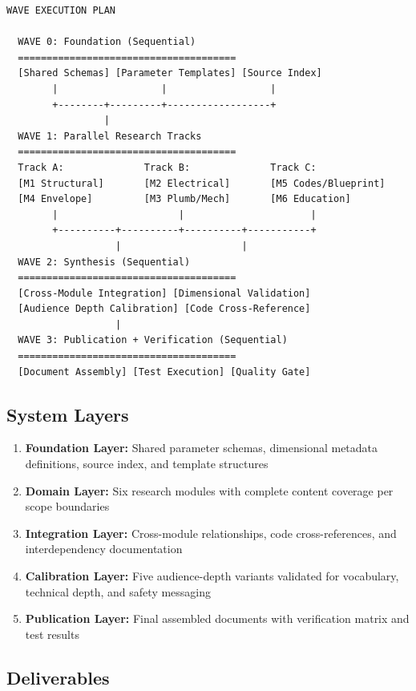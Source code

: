 \documentclass[11pt,letterpaper]{article}
\begin{document}
\begin{asciibox}
\begin{verbatim}
WAVE EXECUTION PLAN

  WAVE 0: Foundation (Sequential)
  ======================================
  [Shared Schemas] [Parameter Templates] [Source Index]
        |                  |                  |
        +--------+---------+------------------+
                 |
  WAVE 1: Parallel Research Tracks
  ======================================
  Track A:              Track B:              Track C:
  [M1 Structural]       [M2 Electrical]       [M5 Codes/Blueprint]
  [M4 Envelope]         [M3 Plumb/Mech]       [M6 Education]
        |                     |                      |
        +----------+----------+----------+-----------+
                   |                     |
  WAVE 2: Synthesis (Sequential)
  ======================================
  [Cross-Module Integration] [Dimensional Validation]
  [Audience Depth Calibration] [Code Cross-Reference]
                   |
  WAVE 3: Publication + Verification (Sequential)
  ======================================
  [Document Assembly] [Test Execution] [Quality Gate]
\end{verbatim}
\end{asciibox}

\subsection{System Layers}

\begin{enumerate}[leftmargin=2em]
\item \textbf{Foundation Layer:} Shared parameter schemas, dimensional metadata definitions, source index, and template structures
\item \textbf{Domain Layer:} Six research modules with complete content coverage per scope boundaries
\item \textbf{Integration Layer:} Cross-module relationships, code cross-references, and interdependency documentation
\item \textbf{Calibration Layer:} Five audience-depth variants validated for vocabulary, technical depth, and safety messaging
\item \textbf{Publication Layer:} Final assembled documents with verification matrix and test results
\end{enumerate}

\subsection{Deliverables}
\end{document}
